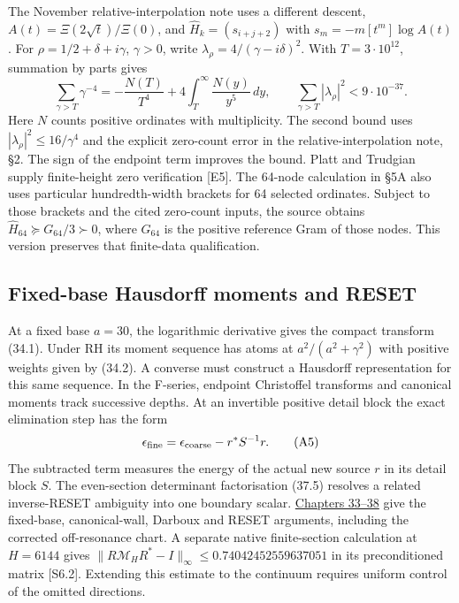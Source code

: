 \documentclass[
  10pt,
  a4paper,
  10pt,
  oneside,
  openany]{book}
\begin{document}
The November relative-interpolation note uses a different descent,
\(A(t)=\Xi(2\sqrt t)/\Xi(0)\), and \(\widehat H_k=(s_{i+j+2})\) with
\(s_m=-m[t^m]\log A(t)\). For \(\rho=1/2+\delta+i\gamma\), \(\gamma>0\),
write \(\lambda_\rho=4/(\gamma-i\delta)^2\). With \(T=3\cdot10^{12}\),
summation by parts gives \[
 \sum_{\gamma>T}\gamma^{-4}
 =-\frac{N(T)}{T^4}+4\int_T^\infty\frac{N(y)}{y^5}\,dy,\qquad
 \sum_{\gamma>T}|\lambda_\rho|^2<9\cdot10^{-37}.
 \tag{A4}\label{eq:A4}
\] Here \(N\) counts positive ordinates with multiplicity. The second
bound uses \(|\lambda_\rho|^2\le16/\gamma^4\) and the explicit
zero-count error in the relative-interpolation note, §2. The sign of the
endpoint term improves the bound. Platt and Trudgian supply
finite-height zero verification {[}E5{]}. The 64-node calculation in §5A
also uses particular hundredth-width brackets for 64 selected ordinates.
Subject to those brackets and the cited zero-count inputs, the source
obtains \(\widehat H_{64}\succeq G_{64}/3\succ0\), where \(G_{64}\) is
the positive reference Gram of those nodes. This version preserves that
finite-data qualification.

\subsection{Fixed-base Hausdorff moments and
RESET}\label{fixed-base-hausdorff-moments-and-reset}

At a fixed base \(a=30\), the logarithmic derivative gives the compact
transform (34.1). Under RH its moment sequence has atoms at
\(a^2/(a^2+\gamma^2)\) with positive weights given by (34.2). A converse
must construct a Hausdorff representation for this same sequence. In the
F-series, endpoint Christoffel transforms and canonical moments track
successive depths. At an invertible positive detail block the exact
elimination step has the form \[
 \epsilon_{\rm fine}=\epsilon_{\rm coarse}-r^*S^{-1}r .
 \tag{A5}\label{eq:A5}
\] The subtracted term measures the energy of the actual new source
\(r\) in its detail block \(S\). The even-section determinant
factorisation (37.5) resolves a related inverse-RESET ambiguity into one
boundary scalar. \hyperref[ch-layercake]{Chapters 33--38} give the
fixed-base, canonical-wall, Darboux and RESET arguments, including the
corrected off-resonance chart. A separate native finite-section
calculation at \(H=6144\) gives
\(\|R\mathcal M_HR^*-I\|_\infty\le0.74042452559637051\) in its
preconditioned matrix {[}S6.2{]}. Extending this estimate to the
continuum requires uniform control of the omitted directions.
\end{document}
